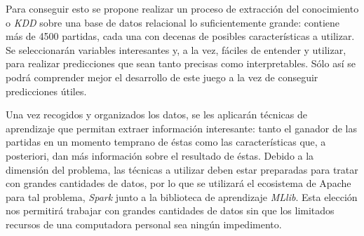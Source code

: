 Para conseguir esto se propone realizar un proceso de extracción del
conocimiento o \emph{KDD} sobre una base de datos relacional lo suficientemente
grande: contiene más de 4500 partidas, cada una con decenas de posibles
características a utilizar. Se seleccionarán variables interesantes y, a la vez,
fáciles de entender y utilizar, para realizar predicciones que sean tanto
precisas como interpretables. Sólo así se podrá comprender mejor el desarrollo
de este juego a la vez de conseguir predicciones útiles.

Una vez recogidos y organizados los datos, se les aplicarán técnicas de
aprendizaje que permitan extraer información interesante: tanto el ganador
de las partidas en un momento temprano de éstas como las características que,
a posteriori, dan más información sobre el resultado de éstas. Debido a la
dimensión del problema, las técnicas a utilizar deben estar preparadas para
tratar con grandes cantidades de datos, por lo que se utilizará el ecosistema
de Apache para tal problema, \emph{Spark} junto a la biblioteca de aprendizaje
\emph{MLlib}. Esta elección nos permitirá trabajar con grandes cantidades de
datos sin que los limitados recursos de una computadora personal sea ningún
impedimento.


